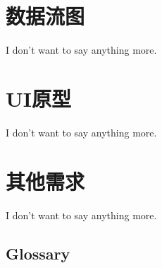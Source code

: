 \newpage


\chapter{数据流图}

I don't want to say anything more.


\newpage


\chapter{UI原型}

I don't want to say anything more.


\newpage


\chapter{其他需求}

I don't want to say anything more.

\newpage



\begin{appendices}
\chapter{Glossary}


\end{appendices}


